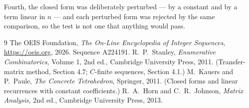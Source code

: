 \documentclass[11pt,a4paper]{article}
\theoremstyle{plain}
\theoremstyle{definition}
\begin{document}
Fourth, the closed form was deliberately perturbed --- by a constant and by a term linear in
$n$ --- and each perturbed form was rejected by the same comparison, so the test is not one
that anything would pass.

\begin{thebibliography}{9}
 The OEIS Foundation, \emph{The On-Line Encyclopedia of Integer
Sequences}, \url{https://oeis.org}, 2026. Sequence A224191.
 R.~P.~Stanley, \emph{Enumerative Combinatorics}, Volume 1, 2nd ed.,
Cambridge University Press, 2011. (Transfer-matrix method, Section 4.7; $C$-finite sequences,
Section 4.1.)
 M.~Kauers and P.~Paule, \emph{The Concrete Tetrahedron}, Springer, 2011.
(Closed forms and linear recurrences with constant coefficients.)
 R.~A.~Horn and C.~R.~Johnson, \emph{Matrix Analysis}, 2nd ed., Cambridge
University Press, 2013.
\end{thebibliography}
\end{document}
